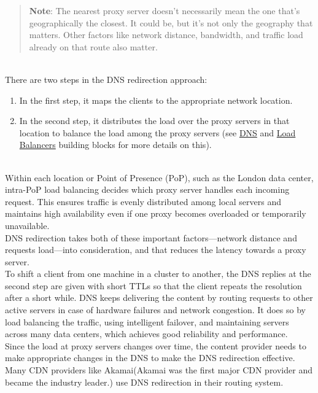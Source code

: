 \begin{quote}
\textbf{Note}: The nearest proxy server doesn't necessarily mean the one that's geographically the closest. It could be, but it's not only the geography that matters. Other factors like network distance, bandwidth, and traffic load already on that route also matter.
\end{quote}
\\
There are two steps in the DNS redirection approach:

\begin{enumerate}
\item
\protect{}\label{6eduM93SHuDV9S2juswTM}
In the first step, it maps the clients to the appropriate network location.
\item
\protect{}\label{EvkYw-_BH-RyubHaor-Gi}
In the second step, it distributes the load over the proxy servers in that location to balance the load among the proxy servers (see \href{https://www.educative.io/courses/grokking-the-system-design-interview/introduction-to-domain-name-system-dns}{DNS} and \href{https://www.educative.io/courses/grokking-the-system-design-interview/introduction-to-load-balancers}{Load Balancers} building blocks for more details on this).
\end{enumerate}
\\
Within each location or Point of Presence (PoP), such as the London data center, intra-PoP load balancing decides which proxy server handles each incoming request. This ensures traffic is evenly distributed among local servers and maintains high availability even if one proxy becomes overloaded or temporarily unavailable.
\\
DNS redirection takes both of these important factors---network distance and requests load---into consideration, and that reduces the latency towards a proxy server.
\\
To shift a client from one machine in a cluster to another, the DNS replies at the second step are given with short TTLs so that the client repeats the resolution after a short while. DNS keeps delivering the content by routing requests to other active servers in case of hardware failures and network congestion. It does so by load balancing the traffic, using intelligent failover, and maintaining servers across many data centers, which achieves good reliability and performance.
\\
Since the load at proxy servers changes over time, the content provider needs to make appropriate changes in the DNS to make the DNS redirection effective. Many CDN providers like Akamai(Akamai was the first major CDN provider and became the industry leader.) use DNS redirection in their routing system.

